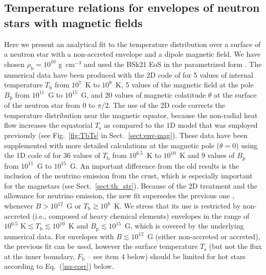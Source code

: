 \documentclass[smallextended]{svjour3}       %
\newcounter{count}
\newcommand{\gcc}{\mbox{g~cm$^{-3}$}}
\newcommand{\req}[1]{Eq.~(\ref{#1})}
\newcommand{\rhob}{\rho_\mathrm{b}}
\newcommand{\Tb}{T_\mathrm{b}}
\newcommand{\Ts}{T_\mathrm{s}}
\begin{document}
\begin{appendix}
\section{Temperature relations for envelopes
of neutron stars with magnetic fields}
\label{sect:TbTs}
\renewcommand{\theequation}{B.\arabic{equation}}
\setcounter{equation}{0}

Here we present an analytical fit to the temperature
distribution over a surface of a neutron star with a
non-accreted envelope and a dipole magnetic field. We have
chosen $\rhob=10^{10}$ \gcc{} and used the BSk21 EoS
\citep{Pearson-ea12} in the parametrized form
\citep{Potekhin-ea13}. The numerical data have been produced
with the 2D code of \citet{vigano13}  for 5 values of
internal temperature $\Tb$ from $10^7$~K to $10^9$~K, 5
values of the magnetic field at the pole $B_\mathrm{p}$ from
$10^{11}$~G to $10^{15}$~G, and 20 values of magnetic
colatitude $\theta$ at the surface of the neutron star from
0 to $\pi/2$. The use of the 2D code corrects the
temperature distribution near the magnetic equator, because
the non-radial heat flow increases the equatorial $\Ts$ as
compared to the 1D model that was employed previously (see
Fig.~\ref{fig:TbTs} in Sect.~\ref{sect:env-mag}). These data
have been supplemented with more detailed calculations at
the magnetic pole ($\theta=0$) using the 1D code of
\citet{PCY07} for 36 values of $\Tb$ from $10^{6.5}$~K to
$10^{10}$~K and 9 values of $B_\mathrm{p}$ from $10^{11}$~G
to $10^{15}$~G. An important difference from the old results
is the inclusion of the neutrino emission from the crust,
which is especially important for the magnetars (see
Sect.~\ref{sect:th_str}). Because of the 2D treatment and
the allowance for neutrino emission, the new fit supersedes
the previous one \citep{Potekhin-ea03}, whenever
$B>10^{12}$~G or $\Tb\gtrsim10^8$~K. We stress that
its use is restricted by non-accreted (i.e., composed of
heavy chemical elements) envelopes in the range of
$10^{6.5}\mbox{~K}\lesssim\Tb\lesssim10^{10}$~K and
$B_\mathrm{p}\lesssim10^{15}$~G, which is covered by the
underlying numerical data. For envelopes with
$B\lesssim10^{12}$~G (either non-accreted or accreted), the
previous fit can be used, however the surface temperature
$\Ts$ (but not the flux at the inner boundary,
$F_\mathrm{b}$ -- see item 4 below) should be limited for
hot stars according to \req{nu-corr} below.


\end{appendix}
\end{document}

